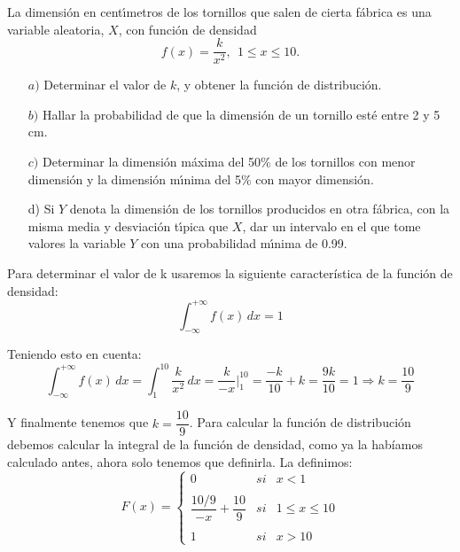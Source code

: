 \problem

La dimensi{\'o}n en cent{\'\i}metros  de  los tornillos  que salen
de cierta f{\'a}brica es una  variable aleatoria, $X$, con funci{\'o}n de densidad
     $$
     f(x) = \displaystyle{\frac{k}{x^{2}}},\ \    1 \leq x \leq 10.
     $$
     \begin{enumerate}
       \item [$a)$]Determinar el valor de $k$, y obtener la funci{\'o}n de distribuci{\'o}n.
       \item [$b)$] Hallar la probabilidad de que la dimensi{\'o}n de un tornillo
             est{\'e}  entre 2 y 5 cm.
       \item [$c)$] Determinar la  dimensi{\'o}n  m{\'a}xima  del 50\%  de los tornillos con menor dimensi{\'o}n y
       la dimensi{\'o}n m{\'\i}nima del 5\%
             con mayor dimensi{\'o}n.
\item [d)] Si $Y$ denota la dimensi{\'o}n de los tornillos producidos en   otra f{\'a}brica, con la misma media y desviaci{\'o}n t{\'\i}pica que $X$,
dar un intervalo en el que tome valores la variable $Y$ con  una probabilidad
m{\'\i}nima de 0.99.
     \end{enumerate}
     
\subproblem

Para determinar el valor de k usaremos la siguiente característica de la función de densidad:
\begin{equation*}
    \int_{-\infty}^{+\infty} f(x) \,dx = 1
\end{equation*}

Teniendo esto en cuenta:
\begin{equation*}
    \int_{-\infty}^{+\infty} f(x) \,dx = \int_1^{10} \dfrac{k}{x^2} \,dx = \dfrac{k}{-x} \Big|^{10}_1 = \dfrac{-k}{10} + k = \dfrac{9k}{10} = 1 \Rightarrow k = \dfrac{10}{9}
\end{equation*}

Y finalmente tenemos que $k = \dfrac{10}{9}$. Para calcular la función de distribución debemos calcular la integral de la función de densidad, como ya la habíamos calculado antes, ahora solo tenemos que definirla. La definimos:
\begin{equation*}
    F(x) = \left\{ \begin{array}{lcc}
             0 &   si  & x < 1 \\
             \\ \dfrac{10/9}{-x} + \dfrac{10}{9} &  si & 1 \leq x \leq 10 \\
             \\ 1 &  si  & x > 10
             \end{array}
   \right.
\end{equation*}


